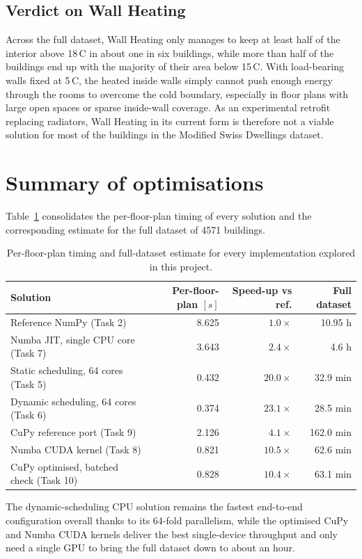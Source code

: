 \documentclass[11pt,a4paper]{article}
\begin{document}
\subsection*{Verdict on Wall Heating}

Across the full dataset, Wall Heating only manages to keep at least half of
the interior above 18\,\textdegree C in about one in six buildings, while more
than half of the buildings end up with the majority of their area below
15\,\textdegree C. With load-bearing walls fixed at 5\,\textdegree C, the
heated inside walls simply cannot push enough energy through the rooms to
overcome the cold boundary, especially in floor plans with large open spaces
or sparse inside-wall coverage. As an experimental retrofit replacing
radiators, Wall Heating in its current form is therefore not a viable solution
for most of the buildings in the Modified Swiss Dwellings dataset.

\section*{Summary of optimisations}

Table~\ref{tab:summary} consolidates the per-floor-plan timing of every
solution and the corresponding estimate for the full dataset of 4571
buildings.

\begin{table}[H]
    \centering
    \begin{tabular}{lrrr}
        \toprule
        Solution & Per-floor-plan \([s]\) & Speed-up vs ref. & Full dataset \\
        \midrule
        Reference NumPy (Task 2)              & 8.625 & \(1.0\times\)  & 10.95 h \\
        Numba JIT, single CPU core (Task 7)   & 3.643 & \(2.4\times\)  & 4.6 h \\
        Static scheduling, 64 cores (Task 5)  & 0.432 & \(20.0\times\) & 32.9 min \\
        Dynamic scheduling, 64 cores (Task 6) & 0.374 & \(23.1\times\) & 28.5 min \\
        CuPy reference port (Task 9)          & 2.126 & \(4.1\times\)  & 162.0 min \\
        Numba CUDA kernel (Task 8)            & 0.821 & \(10.5\times\) & 62.6 min \\
        CuPy optimised, batched check (Task 10) & 0.828 & \(10.4\times\) & 63.1 min \\
        \bottomrule
    \end{tabular}
    \caption{Per-floor-plan timing and full-dataset estimate for every
    implementation explored in this project.}
    \label{tab:summary}
\end{table}

\noindent The dynamic-scheduling CPU solution remains the fastest end-to-end
configuration overall thanks to its 64-fold parallelism, while the optimised
CuPy and Numba CUDA kernels deliver the best single-device throughput and only
need a single GPU to bring the full dataset down to about an hour.
\end{document}
